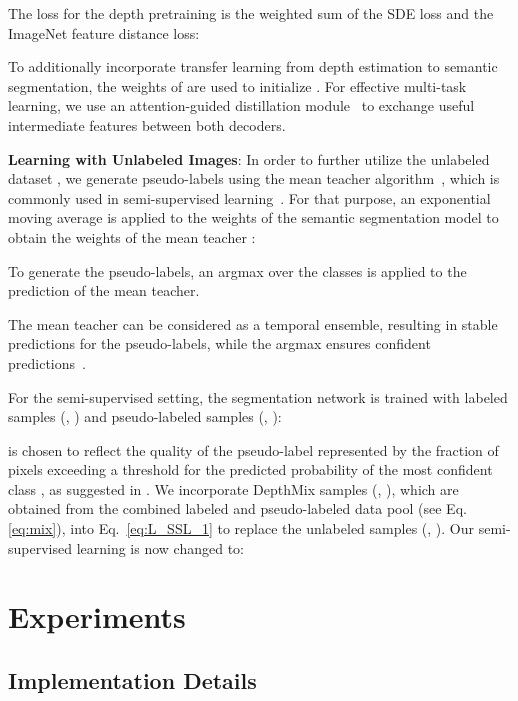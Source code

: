 \documentclass[final]{cvpr}
\begin{document}
The loss for the depth pretraining is the weighted sum of the SDE loss and the ImageNet feature distance loss:


To additionally incorporate transfer learning from depth estimation to semantic segmentation, the weights of  are used to initialize . 
For effective multi-task learning, we use an attention-guided distillation module~\cite{xu2018pad} to exchange useful intermediate features between both decoders.

\noindent\textbf{Learning with Unlabeled Images}:
In order to further utilize the unlabeled dataset , we generate pseudo-labels using the mean teacher algorithm~\cite{tarvainen2017mean}, which is commonly used in semi-supervised learning~\cite{berthelot2019mixmatch, verma2019interpolation, french2019consistency, olsson2020classmix}. For that purpose, an exponential moving average is applied to the weights of the semantic segmentation model  to obtain the weights of the mean teacher :

To generate the pseudo-labels, an argmax over the classes  is applied to the prediction of the mean teacher. 

The mean teacher can be considered as a temporal ensemble, resulting in stable predictions for the pseudo-labels, while the argmax ensures confident predictions~\cite{olsson2020classmix}. 

For the semi-supervised setting, the segmentation network is trained with labeled samples (, ) and pseudo-labeled samples (, ):

 is chosen to reflect the quality of the pseudo-label represented by the fraction of pixels exceeding a threshold  for the predicted probability of the most confident class , as suggested in \cite{olsson2020classmix}. We incorporate DepthMix samples (, ), which are obtained from the combined labeled and pseudo-labeled data pool  (see Eq. \ref{eq:mix}), into Eq.~\ref{eq:L_SSL_1} to replace the unlabeled samples (, ). Our semi-supervised learning is now changed to:









 \section{Experiments}
\label{sec:experiments}

\subsection{Implementation Details}
\end{document}
